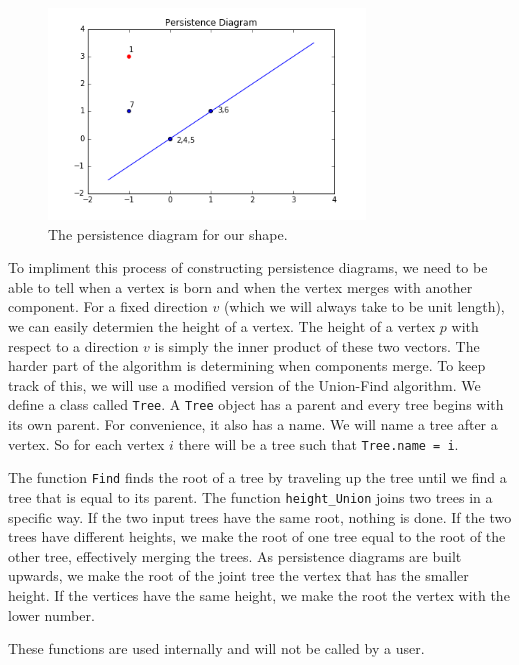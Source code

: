 \documentclass[codesnippet]{jss}
\begin{document}
\begin{figure}
\centering
\includegraphics[width = 0.75\textwidth]{../diagram.png}
\caption{\label{diagram} The persistence diagram for our shape.}
\end{figure}


To impliment this process of constructing persistence diagrams, we need to be able to tell when a vertex is born and when the vertex merges with another component.  For a fixed direction $v$ (which we will always take to be unit length), we can easily determien the height of a vertex. The height of a vertex $p$ with respect to a direction $v$ is simply the inner product of these two vectors.  The harder part of the algorithm is determining when components merge.  To keep track of this, we will use a modified version of the Union-Find algorithm.  We define a class called \texttt{Tree}.  A \texttt{Tree} object has a parent and every tree begins with its own parent.  For convenience, it also has a name.  We will name a tree after a vertex.  So for each vertex $i$ there will be a tree such that \texttt{Tree.name = i}.  

The function \texttt{Find} finds the root of a tree by traveling up the tree until we find a tree that is equal to its parent.  The function \texttt{height\_Union} joins two trees in a specific way.  If the two input trees have the same root, nothing is done.  If the two trees have different heights, we make the root of one tree equal to the root of the other tree, effectively merging the trees.  As persistence diagrams are built upwards, we make the root of the joint tree the vertex that has the smaller height.  If the vertices have the same height, we make the root the vertex with the lower number.  

These functions are used internally and will not be called by a user.  
\end{document}
